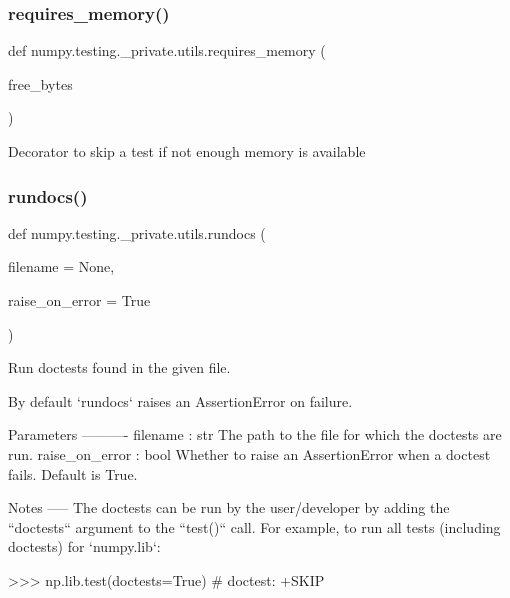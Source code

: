\subsubsection{\texorpdfstring{requires\+\_\+memory()}{requires\_memory()}}
{\footnotesize\ttfamily def numpy.\+testing.\+\_\+private.\+utils.\+requires\+\_\+memory (\begin{DoxyParamCaption}\item[{}]{free\+\_\+bytes }\end{DoxyParamCaption})}

\begin{DoxyVerb}Decorator to skip a test if not enough memory is available\end{DoxyVerb}
 \mbox{\label{namespacenumpy_1_1testing_1_1__private_1_1utils_a48c115c99f509ef5e51a2b610b9a6e23}} 
\subsubsection{\texorpdfstring{rundocs()}{rundocs()}}
{\footnotesize\ttfamily def numpy.\+testing.\+\_\+private.\+utils.\+rundocs (\begin{DoxyParamCaption}\item[{}]{filename = {\ttfamily None},  }\item[{}]{raise\+\_\+on\+\_\+error = {\ttfamily True} }\end{DoxyParamCaption})}

\begin{DoxyVerb}Run doctests found in the given file.

By default `rundocs` raises an AssertionError on failure.

Parameters
----------
filename : str
    The path to the file for which the doctests are run.
raise_on_error : bool
    Whether to raise an AssertionError when a doctest fails. Default is
    True.

Notes
-----
The doctests can be run by the user/developer by adding the ``doctests``
argument to the ``test()`` call. For example, to run all tests (including
doctests) for `numpy.lib`:

>>> np.lib.test(doctests=True)  # doctest: +SKIP
\end{DoxyVerb}
 \mbox{\label{namespacenumpy_1_1testing_1_1__private_1_1utils_a0b3b4184cfb5ec5d8ce7e63d0dc1a540}} 
